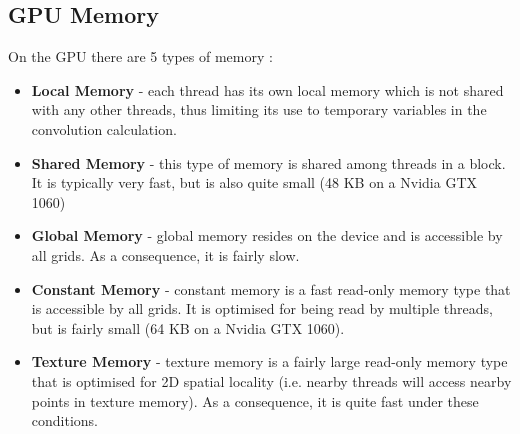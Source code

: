 \documentclass[10pt]{article}
\begin{document}
\subsection{GPU Memory}
On the GPU there are 5 types of memory \cite{wang19}:
\begin{itemize}
\item \textbf{Local Memory} - each thread has its own local memory which is not shared with any other threads, thus limiting its use to temporary variables in the convolution calculation.
\item \textbf{Shared Memory} - this type of memory is shared among threads in a block. It is typically very fast, but is also quite small (48 KB on a Nvidia GTX 1060\cite{nvidia19})
\item \textbf{Global Memory} - global memory resides on the device and is accessible by all grids. As a consequence, it is fairly slow.
\item \textbf{Constant Memory} - constant memory is a fast read-only memory type that is accessible by all grids. It is optimised for being read by multiple threads, but is fairly small (64 KB on a Nvidia GTX 1060\cite{nvidia19}).
\item \textbf{Texture Memory} - texture memory is a fairly large read-only memory type that is optimised for 2D spatial locality (i.e. nearby threads will access nearby points in texture memory). As a consequence, it is quite fast under these conditions.
\end{itemize}
\end{document}
